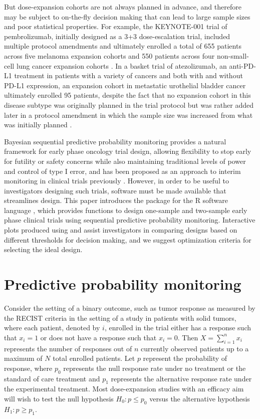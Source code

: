 But dose-expansion cohorts are not always planned in advance, and
therefore may be subject to on-the-fly decision making that can lead to
large sample sizes and poor statistical properties. For example, the
KEYNOTE-001 trial of pembrolizumab, initially designed as a 3+3
dose-escalation trial, included multiple protocol amendments and
ultimately enrolled a total of 655 patients across five melanoma
expansion cohorts and 550 patients across four non-small-cell lung
cancer expansion cohorts \citep{Khoja2015}. In a basket trial of
atezolizumab, an anti-PD-L1 treatment in patients with a variety of
cancers and both with and without PD-L1 expression, an expansion cohort
in metastatic urothelial bladder cancer ultimately enrolled 95 patients,
despite the fact that no expansion cohort in this disease subtype was
originally planned in the trial protocol but was rather added later in a
protocol amendment in which the sample size was increased from what was
initially planned \citep{Petrylak2018, Powles2014}.

Bayesian sequential predictive probability monitoring provides a natural
framework for early phase oncology trial design, allowing flexibility to
stop early for futility or safety concerns while also maintaining
traditional levels of power and control of type I error, and has been
proposed as an approach to interim monitoring in clinical trials
previously \citep{Dmitrienko2006, Lee2008, Saville2014}. However, in
order to be useful to investigators designing such trials, software must
be made available that streamlines design. This paper introduces the
 package for the R software language \citep{RCT2020}, which
provides functions to design one-sample and two-sample early phase
clinical trials using sequential predictive probability monitoring.
Interactive plots produced using  and 
assist investigators in comparing designs based on different thresholds
for decision making, and we suggest optimization criteria for selecting
the ideal design.

\hypertarget{predictive-probability-monitoring}{%
\section{Predictive probability
monitoring}\label{predictive-probability-monitoring}}

Consider the setting of a binary outcome, such as tumor response as
measured by the RECIST criteria in the setting of a study in patients
with solid tumors, where each patient, denoted by \(i\), enrolled in the
trial either has a response such that \(x_i = 1\) or does not have a
response such that \(x_i = 0\). Then \(X = \sum_{i=1}^n x_i\) represents
the number of responses out of \(n\) currently observed patients up to a
maximum of \(N\) total enrolled patients. Let \(p\) represent the
probability of response, where \(p_0\) represents the null response rate
under no treatment or the standard of care treatment and \(p_1\)
represents the alternative response rate under the experimental
treatment. Most dose-expansion studies with an efficacy aim will wish to
test the null hypothesis \(H_0: p \leq p_0\) versus the alternative
hypothesis \(H_1: p \geq p_1\).


